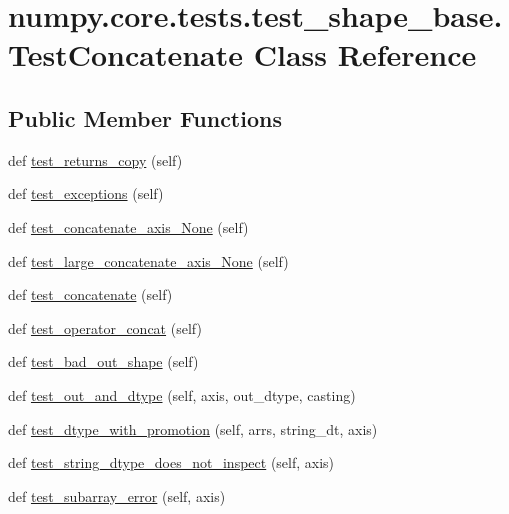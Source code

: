 \hypertarget{classnumpy_1_1core_1_1tests_1_1test__shape__base_1_1TestConcatenate}{}\section{numpy.\+core.\+tests.\+test\+\_\+shape\+\_\+base.\+Test\+Concatenate Class Reference}
\label{classnumpy_1_1core_1_1tests_1_1test__shape__base_1_1TestConcatenate}
\subsection*{Public Member Functions}
\begin{DoxyCompactItemize}
\item 
def \hyperlink{classnumpy_1_1core_1_1tests_1_1test__shape__base_1_1TestConcatenate_ab055ac42ec88bb5c97b24dbeab0e7ee2}{test\+\_\+returns\+\_\+copy} (self)
\item 
def \hyperlink{classnumpy_1_1core_1_1tests_1_1test__shape__base_1_1TestConcatenate_ac14f743676c9055b2b90dd1aa40eb1a6}{test\+\_\+exceptions} (self)
\item 
def \hyperlink{classnumpy_1_1core_1_1tests_1_1test__shape__base_1_1TestConcatenate_af80504df07d4c6a309e6dc5e53b29dd0}{test\+\_\+concatenate\+\_\+axis\+\_\+\+None} (self)
\item 
def \hyperlink{classnumpy_1_1core_1_1tests_1_1test__shape__base_1_1TestConcatenate_a0695cc248dcd4184a275314b3b62deb6}{test\+\_\+large\+\_\+concatenate\+\_\+axis\+\_\+\+None} (self)
\item 
def \hyperlink{classnumpy_1_1core_1_1tests_1_1test__shape__base_1_1TestConcatenate_ae2261c70308d7a5e5f25961031b19ac4}{test\+\_\+concatenate} (self)
\item 
def \hyperlink{classnumpy_1_1core_1_1tests_1_1test__shape__base_1_1TestConcatenate_a341615b7efba27a6474342984e3c3d93}{test\+\_\+operator\+\_\+concat} (self)
\item 
def \hyperlink{classnumpy_1_1core_1_1tests_1_1test__shape__base_1_1TestConcatenate_ab601ec889fe23e76af9a6381b3d45efa}{test\+\_\+bad\+\_\+out\+\_\+shape} (self)
\item 
def \hyperlink{classnumpy_1_1core_1_1tests_1_1test__shape__base_1_1TestConcatenate_ad2558f9a93ca71ef098f1b1cea27dfdd}{test\+\_\+out\+\_\+and\+\_\+dtype} (self, axis, out\+\_\+dtype, casting)
\item 
def \hyperlink{classnumpy_1_1core_1_1tests_1_1test__shape__base_1_1TestConcatenate_a5675924b125adb8c00a175db6153754a}{test\+\_\+dtype\+\_\+with\+\_\+promotion} (self, arrs, string\+\_\+dt, axis)
\item 
def \hyperlink{classnumpy_1_1core_1_1tests_1_1test__shape__base_1_1TestConcatenate_a45315e73f36059b44cae4dd211b4595f}{test\+\_\+string\+\_\+dtype\+\_\+does\+\_\+not\+\_\+inspect} (self, axis)
\item 
def \hyperlink{classnumpy_1_1core_1_1tests_1_1test__shape__base_1_1TestConcatenate_ada4e5b372a02faaa84046ce322317330}{test\+\_\+subarray\+\_\+error} (self, axis)
\end{DoxyCompactItemize}

